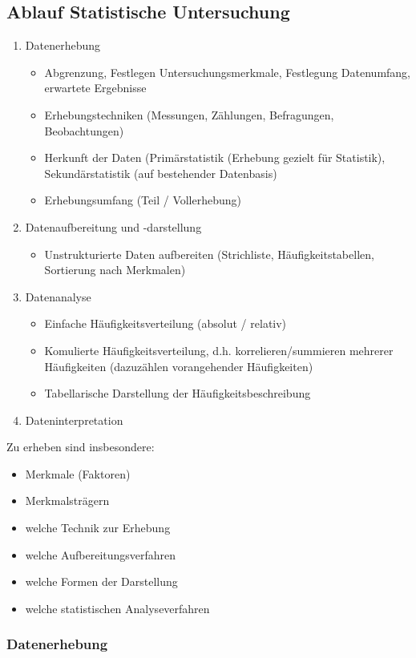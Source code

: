 \subsection{Ablauf Statistische Untersuchung}
\begin{enumerate}
	\item	Datenerhebung
		\begin{itemize}
			\item	Abgrenzung, Festlegen Untersuchungsmerkmale, Festlegung Datenumfang, erwartete Ergebnisse
			\item	Erhebungstechniken (Messungen, Zählungen, Befragungen, Beobachtungen)
			\item	Herkunft der Daten (Primärstatistik (Erhebung gezielt für Statistik), Sekundärstatistik (auf bestehender Datenbasis)
			\item Erhebungsumfang (Teil / Vollerhebung)
		\end{itemize}
	\item	Datenaufbereitung und -darstellung
		\begin{itemize}
			\item Unstrukturierte Daten aufbereiten (Strichliste, Häufigkeitstabellen, Sortierung nach Merkmalen)
		\end{itemize}
	\item	Datenanalyse
		\begin{itemize}
			\item Einfache Häufigkeitsverteilung (absolut / relativ)
			\item Komulierte Häufigkeitsverteilung, d.h. korrelieren/summieren mehrerer Häufigkeiten (dazuzählen vorangehender Häufigkeiten)
			\item Tabellarische Darstellung der Häufigkeitsbeschreibung
		\end{itemize}
	\item	Dateninterpretation
\end{enumerate}

Zu erheben sind insbesondere:
\begin{itemize}
	\item Merkmale (Faktoren)
	\item Merkmalsträgern
	\item welche Technik zur Erhebung
	\item welche Aufbereitungsverfahren
	\item welche Formen der Darstellung
	\item welche statistischen Analyseverfahren
\end{itemize}

\subsubsection{Datenerhebung}
	

